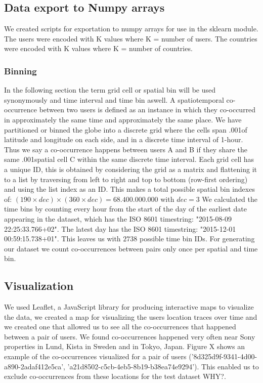 \subsection{Data export to Numpy arrays}
We created scripts for exportation to numpy arrays for use in the sklearn module. The users were encoded with K values where K = number of users. The countries were encoded with K values where K = number of countries.

\subsubsection{Binning} \label{ssec:binning}
In the following section the term grid cell or spatial bin will be used synonymously and time interval and time bin aswell.
A spatiotemporal co-occurrence between two users is defined as an instance in which they co-occurred in approximately the same time and approximately the same place.
We have partitioned or binned the globe into a discrete grid where the cells span .001\degree of latitude and longitude on each side, and in a discrete time interval of 1-hour.
Thus we say a co-occurrence happens between users A and B if they share the same .001\degree spatial cell C within the same discrete time interval.
 Each grid cell has a unique ID, this is obtained by considering the grid as a matrix and flattening it to a list by traversing from left to right and top to bottom (row-first ordering) and using the list index as an ID. This makes a total possible spatial bin indexes of: $(190\times dec)\times(360\times dec)=68.400.000.000$ with $dec=3$ We calculated the time bins by counting every hour from the start of the day of the earliest date appearing in the dataset, which has the ISO 8601 timestring: "2015-08-09 22:25:33.766+02". The latest day has the ISO 8601 timestring: "2015-12-01 00:59:15.738+01". This leaves us with $2738$ possible time bin IDs. For generating our dataset we count co-occurrences between pairs only once per spatial and time bin.


\subsection{Visualization}
We used Leaflet\cite{leaflet}, a JavaScript library for producing interactive maps to visualize the data, we created a map for visualizing the users location traces over time and we created one that allowed us to see all the co-occurrences that happened between a pair of users. We found co-occurrences happened very often near Sony properties in Lund\cite{sony_headquarters_sweden_lund}, Kista\cite{sony_headquarters_sweden_kista} in Sweden and in Tokyo\cite{sony_headquarters_japan}, Japan. Figure X shows an example of the co-occurrences visualized for a pair of users ('8d325d9f-9341-4d00-a890-2adaf412e5ca', 'a21d8502-c5cb-4eb5-8b19-b38ea74e9294'). This enabled us to exclude co-occurrences from these locations for the test dataset {\color{red} WHY?}.

